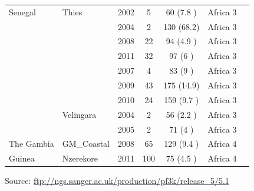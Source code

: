 \documentclass[9pt,lineno]{elife}
\begin{document}
\begin{table}[bt]
\begin{tabular}{l l c c c c c}
 \hline
Senegal         &Thies          &2002 &5    &60   (7.8 )&Africa 3\\
                &               &2004 &2    &130  (68.2)&Africa 3\\
                &               &2008 &22   &94   (4.9 )&Africa 3\\
                &               &2011 &32   &97   (6   )&Africa 3\\
                &               &2007 &4    &83   (9   )&Africa 3\\
                &               &2009 &43   &175  (14.9)&Africa 3\\
                &               &2010 &24   &159  (9.7 )&Africa 3\\
                &Velingara      &2004 &2    &56   (2.2 )&Africa 3\\
                &               &2005 &2    &71   (4   )&Africa 3\\
 \hline
The Gambia      &GM\_Coastal    &2008 &65   &129  (9.4 )&Africa 4\\
 \hline
Guinea          &Nzerekore      &2011 &100  &75   (4.5 )&Africa 4\\
\bottomrule
\end{tabular}

\medskip
Source: \url{ftp://ngs.sanger.ac.uk/production/pf3k/release_5/5.1}

\end{table}
\end{document}
